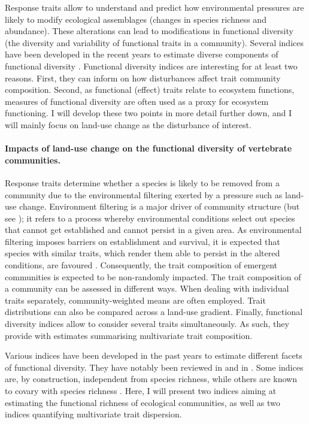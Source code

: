 Response traits allow to understand and predict how environmental pressures are likely to modify ecological assemblages (changes in species richness and abundance). These alterations can lead to modifications in functional diversity (the diversity and variability of functional traits  in a community). Several indices have been developed in the recent years to estimate diverse components of functional diversity \citep{Schleuter2010, Villeger2008, Legras2018, Laliberte2010}. Functional diversity indices are interesting for at least two reasons. First, they can inform on how disturbances affect trait community composition. Second, as functional (effect) traits relate to ecosystem functions, measures of functional diversity are often used as a proxy for ecosystem functioning. I will develop these two points in more detail further down, and I will mainly focus on land-use change as the disturbance of interest. 

\paragraph{Impacts of land-use change on the functional diversity of vertebrate communities.}

Response traits determine whether a species is likely to be removed from a community due to the environmental filtering exerted by a pressure such as land-use change. Environment filtering is a major driver of community structure (but see \citet{Cadotte2017}); it refers to a process whereby environmental conditions select out species that cannot get established and cannot persist in a given area. As environmental filtering imposes barriers on establishment and survival, it is expected that species with similar traits, which render them able to persist in the altered conditions, are favoured \citep{Wong2018, Cadotte2017}. Consequently, the trait composition of emergent communities is expected to be non-randomly impacted.  The trait composition of a community can be assessed in different ways. When dealing with individual traits separately, community-weighted means are often employed. Trait distributions can also be compared across a land-use gradient. Finally, functional diversity indices allow to consider several traits simultaneously. As such, they provide with estimates summarising multivariate trait composition.

Various indices have been developed in the past years to estimate different facets of functional diversity. They have notably been reviewed in \citet{Schleuter2010} and in \citet{Legras2018}. Some indices are, by construction, independent from species richness, while others are known to covary with species richness \citep{Schleuter2010}. Here, I will present two indices aiming at estimating the functional richness of ecological communities, as well as two indices quantifying multivariate trait dispersion.

